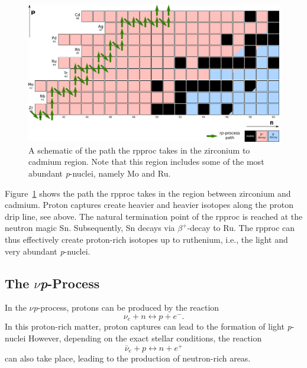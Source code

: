\begin{figure}[tb]
    \centering
    \includegraphics[width=\textwidth]{graphics/p-nuclei/rp-proc}
    \caption{A schematic of the path the \ac{rpproc} takes in the zirconium to cadmium region. Note that this region includes some of the most abundant \textit{p}-nuclei, namely Mo and Ru.}
    \label{fig:p-nuclei:rp-process}
\end{figure}
Figure~\ref{fig:p-nuclei:rp-process} shows the path the \ac{rpproc} takes in the region between zirconium and cadmium. Proton captures create heavier and heavier isotopes along the proton drip line, see above. The natural termination point of the \ac{rpproc} is reached at the neutron magic Sn. Subsequently, Sn decays via $\beta^{+}$-decay to Ru. The \ac{rpproc} can thus effectively create proton-rich isotopes up to ruthenium, i.e., the light and very abundant \textit{p}-nuclei.


\subsection{\protect\boldmath The \texorpdfstring{$\nu$}{nu}\textit{p}-Process}

In the $\nu$\textit{p}-process, protons can be produced by the reaction 
\begin{equation}
    \nu_e + n \longleftrightarrow  p + e^{-}. \label{eqn:p-nuclei:nu_capture_on_n}
\end{equation}
In this proton-rich matter, proton captures can lead to the formation of light \textit{p}-nuclei
However, depending on the exact stellar conditions, the reaction 
\begin{equation}
    \bar{\nu}_e + p \longleftrightarrow n + e^{+} \label{eqn:p-nuclei:nubar_capture_on_p}
\end{equation}
can also take place, leading to the production of neutron-rich areas.


